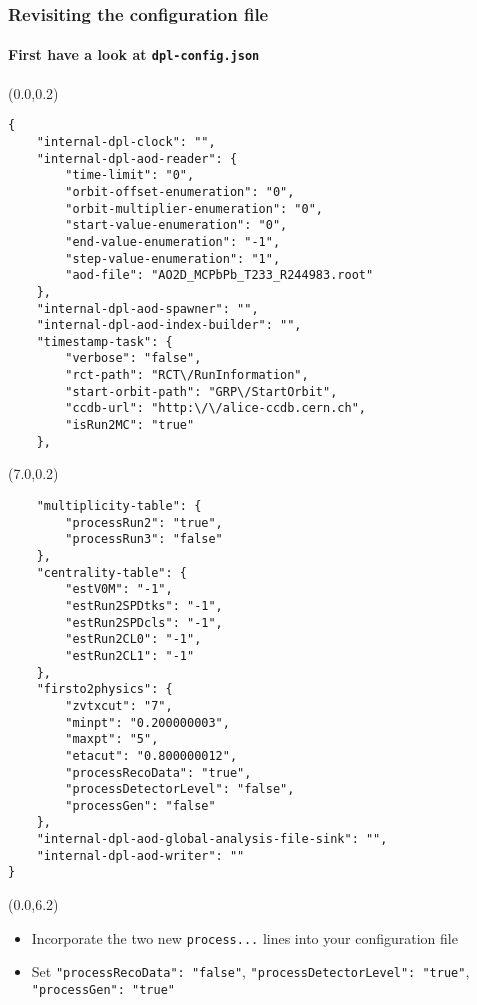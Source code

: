 \documentclass[14pt,aspectratio=169,t]{beamer}
\begin{document}
\begin{frame}[fragile]
  \frametitle{Revisiting the configuration file}
  \framesubtitle{First have a look at \texttt{dpl-config.json}}
  \begin{textblock}{6}(0.0,0.2)
    {\tiny\color{blue}
    \vspace{-0.0in}
    \begin{verbatim}
{
    "internal-dpl-clock": "",
    "internal-dpl-aod-reader": {
        "time-limit": "0",
        "orbit-offset-enumeration": "0",
        "orbit-multiplier-enumeration": "0",
        "start-value-enumeration": "0",
        "end-value-enumeration": "-1",
        "step-value-enumeration": "1",
        "aod-file": "AO2D_MCPbPb_T233_R244983.root"
    },
    "internal-dpl-aod-spawner": "",
    "internal-dpl-aod-index-builder": "",
    "timestamp-task": {
        "verbose": "false",
        "rct-path": "RCT\/RunInformation",
        "start-orbit-path": "GRP\/StartOrbit",
        "ccdb-url": "http:\/\/alice-ccdb.cern.ch",
        "isRun2MC": "true"
    },
    \end{verbatim}}
  \end{textblock}
  \begin{textblock}{6}(7.0,0.2)
    {\tiny\color{blue}
    \vspace{-0.0in}
    \begin{verbatim}
    "multiplicity-table": {
        "processRun2": "true",
        "processRun3": "false"
    },
    "centrality-table": {
        "estV0M": "-1",
        "estRun2SPDtks": "-1",
        "estRun2SPDcls": "-1",
        "estRun2CL0": "-1",
        "estRun2CL1": "-1"
    },
    "firsto2physics": {
        "zvtxcut": "7",
        "minpt": "0.200000003",
        "maxpt": "5",
        "etacut": "0.800000012",
        "processRecoData": "true",
        "processDetectorLevel": "false",
        "processGen": "false"
    },
    "internal-dpl-aod-global-analysis-file-sink": "",
    "internal-dpl-aod-writer": ""
}    \end{verbatim}}
  \end{textblock}
  \begin{textblock}{14}(0.0,6.2)
    \begin{itemize}
      \small
      \item Incorporate the two new {\color{blue}\texttt{process...}} lines into your configuration file
      \item Set {\scriptsize\color{blue} \verb|"processRecoData": "false"|, \verb|"processDetectorLevel": "true"|, \verb|"processGen": "true"|}
    \end{itemize}
  \end{textblock}
\end{frame}
\end{document}
